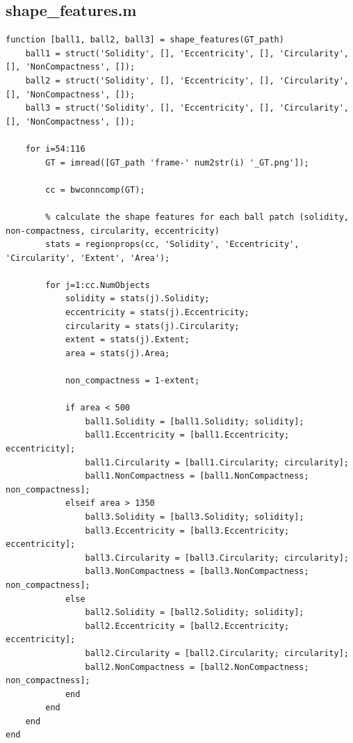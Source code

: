 \documentclass[conference]{IEEEtran}
\begin{document}
        \subsection{shape\_features.m}
            \begin{lstlisting}[style=Matlab-editor, basicstyle=\scriptsize]
function [ball1, ball2, ball3] = shape_features(GT_path)
    ball1 = struct('Solidity', [], 'Eccentricity', [], 'Circularity', [], 'NonCompactness', []);
    ball2 = struct('Solidity', [], 'Eccentricity', [], 'Circularity', [], 'NonCompactness', []);
    ball3 = struct('Solidity', [], 'Eccentricity', [], 'Circularity', [], 'NonCompactness', []);

    for i=54:116
        GT = imread([GT_path 'frame-' num2str(i) '_GT.png']);

        cc = bwconncomp(GT);

        % calculate the shape features for each ball patch (solidity, non-compactness, circularity, eccentricity)
        stats = regionprops(cc, 'Solidity', 'Eccentricity', 'Circularity', 'Extent', 'Area');
        
        for j=1:cc.NumObjects
            solidity = stats(j).Solidity;
            eccentricity = stats(j).Eccentricity;
            circularity = stats(j).Circularity;
            extent = stats(j).Extent;
            area = stats(j).Area;

            non_compactness = 1-extent;

            if area < 500
                ball1.Solidity = [ball1.Solidity; solidity];
                ball1.Eccentricity = [ball1.Eccentricity; eccentricity];
                ball1.Circularity = [ball1.Circularity; circularity];
                ball1.NonCompactness = [ball1.NonCompactness; non_compactness];
            elseif area > 1350
                ball3.Solidity = [ball3.Solidity; solidity];
                ball3.Eccentricity = [ball3.Eccentricity; eccentricity];
                ball3.Circularity = [ball3.Circularity; circularity];
                ball3.NonCompactness = [ball3.NonCompactness; non_compactness];
            else
                ball2.Solidity = [ball2.Solidity; solidity];
                ball2.Eccentricity = [ball2.Eccentricity; eccentricity];
                ball2.Circularity = [ball2.Circularity; circularity];
                ball2.NonCompactness = [ball2.NonCompactness; non_compactness];
            end
        end
    end
end
            \end{lstlisting}
\end{document}
